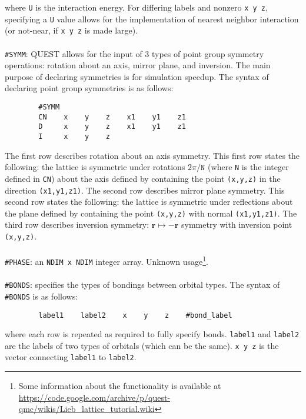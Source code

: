 \documentclass[12pt]{article}
\begin{document}
        where \texttt{U} is the interaction energy.
        For differing labels and nonzero \texttt{x    y    z}, specifying a \texttt{U} value allows for the implementation of nearest neighbor interaction (or not-near, if \texttt{x    y    z} is made large). \\
        \\
        \texttt{\#SYMM}: QUEST allows for the input of $3$ types of point group symmetry operations: rotation about an axis, mirror plane, and inversion.
        The main purpose of declaring symmetries is for simulation speedup.
        The syntax of declaring point group symmetries is as follows:
        \begin{verbatim}
        #SYMM
        CN    x    y    z    x1    y1    z1
        D     x    y    z    x1    y1    z1
        I     x    y    z
        \end{verbatim}
        The first row describes rotation about an axis symmetry.
        This first row states the following: the lattice is symmetric under rotations $2\pi/\texttt{N}$ (where \texttt{N} is the integer defined in \texttt{CN}) about the axis defined by containing the point \texttt{(x,y,z)} in the direction \texttt{(x1,y1,z1)}.
        The second row describes mirror plane symmetry.
        This second row states the following: the lattice is symmetric under reflections about the plane defined by containing the point \texttt{(x,y,z)} with normal \texttt{(x1,y1,z1)}.
        The third row describes inversion symmetry: $\mathbf{r}\mapsto-\mathbf{r}$ symmetry with inversion point \texttt{(x,y,z)}. \\
        \\
        \texttt{\#PHASE}: an \texttt{NDIM x NDIM} integer array. Unknown usage\footnote{Some information about the functionality is available at \url{https://code.google.com/archive/p/quest-qmc/wikis/Lieb_lattice_tutorial.wiki}}. \\
        \\
        \texttt{\#BONDS}: specifies the types of bondings between orbital types.
        The syntax of \texttt{\#BONDS} is as follows:
        \begin{verbatim}
        label1    label2    x    y    z    #bond_label
        \end{verbatim}
        where each row is repeated as required to fully specify bonds.
        \texttt{label1} and \texttt{label2} are the labels of two types of orbitals (which can be the same).
        \texttt{x    y    z} is the vector connecting \texttt{label1} to \texttt{label2}.
\end{document}
